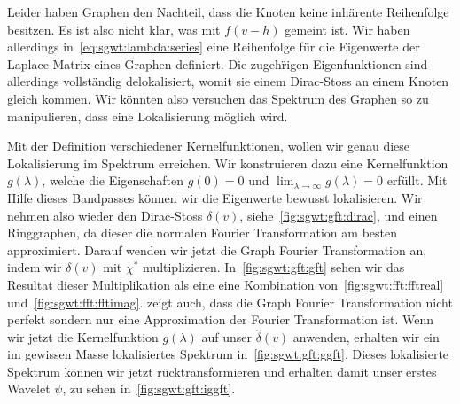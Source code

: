 Leider haben Graphen den Nachteil, dass die Knoten keine inh\"arente 
Reihenfolge besitzen. Es ist also nicht klar, was mit $f(v - h)$ gemeint ist. 
Wir haben allerdings in~\cref{eq:sgwt:lambda:series} eine Reihenfolge f\"ur die 
Eigenwerte der Laplace-Matrix eines Graphen definiert. Die zugeh\"rigen Eigenfunktionen sind 
allerdings vollst\"andig delokalisiert, womit sie einem Dirac-Stoss an einem 
Knoten gleich kommen. Wir k\"onnten also versuchen das Spektrum des Graphen so 
zu manipulieren, dass eine Lokalisierung m\"oglich wird.

Mit der Definition verschiedener Kernelfunktionen, wollen wir genau diese 
Lokalisierung im Spektrum erreichen. Wir konstruieren dazu eine Kernelfunktion 
$g(\lambda)$, welche die Eigenschaften $g(0) = 0$ und $\lim_{\lambda\to\infty} 
g(\lambda) = 0$ erf\"ullt. Mit Hilfe dieses Bandpasses k\"onnen wir die 
Eigenwerte bewusst lokalisieren.
Wir nehmen also wieder den Dirac-Stoss $\delta(v)$, 
siehe~\cref{fig:sgwt:gft:dirac}, und einen Ringgraphen, da dieser die normalen 
Fourier Transformation am besten 
approximiert. Darauf wenden wir jetzt die Graph Fourier Transformation an, 
indem wir $\delta(v)$ mit $\chi^*$ multiplizieren.
In~\cref{fig:sgwt:gft:gft} sehen wir das Resultat dieser Multiplikation als eine
eine Kombination von~\cref{fig:sgwt:fft:fftreal} 
und~\cref{fig:sgwt:fft:fftimag}.  zeigt auch, 
dass die Graph Fourier Transformation nicht perfekt sondern nur eine 
Approximation der Fourier Transformation ist. Wenn wir jetzt die Kernelfunktion 
$g(\lambda)$ auf unser $\hat{\delta}(v)$ anwenden, erhalten wir ein im gewissen 
Masse lokalisiertes Spektrum in~\cref{fig:sgwt:gft:ggft}. Dieses lokalisierte 
Spektrum k\"onnen wir jetzt r\"ucktransformieren und erhalten damit unser 
erstes Wavelet $\psi$, zu sehen in~\cref{fig:sgwt:gft:iggft}.
